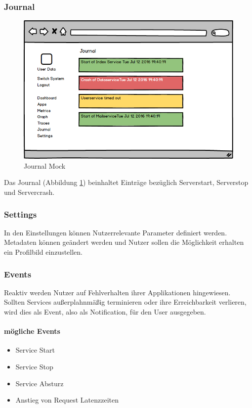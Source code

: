 \subsubsection{Journal}

\begin{figure}[h]
 \centering
 \includegraphics[width=0.6\linewidth]{kapitel1/mocks/journal.png}
 \caption{Journal Mock}
 \label{fig:journalmock}
\end{figure}

Das Journal (Abbildung \ref{fig:journalmock}) beinhaltet Einträge bezüglich Serverstart, Serverstop und Servercrash.


\subsubsection{Settings}

In den Einstellungen können Nutzerrelevante Parameter definiert werden. Metadaten können geändert werden
und Nutzer sollen die Möglichkeit erhalten ein Profilbild einzustellen.

\subsubsection{Events}

Reaktiv werden Nutzer auf Fehlverhalten ihrer Applikationen hingewiesen. Sollten Services außerplahnmäßig terminieren oder ihre Erreichbarkeit verlieren,
wird dies als Event, also als Notification, für den User ausgegeben.

\paragraph{mögliche Events}
\begin{itemize}
\item Service Start
\item Service Stop
\item Service Absturz
\item Anstieg von Request Latenzzeiten
\end{itemize}


